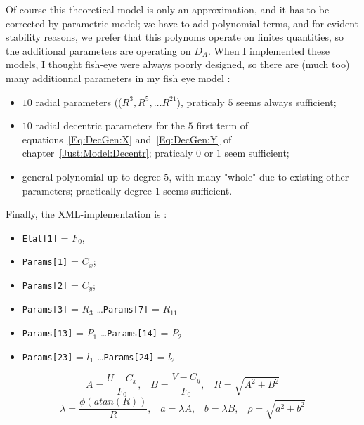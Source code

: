 Of course this theoretical model is only an approximation, and it has to be corrected
by parametric model; we have to add polynomial terms, and for evident stability reasons,
we prefer that this polynoms operate on finites quantities, so the additional
parameters are operating on $D_A$.  When I implemented these models, I thought
fish-eye were always poorly designed, so there are (much too) many additionnal
parameters in my fish eye model :


\begin{itemize}
   \item $10$  radial parameters (($R^3, R^5 , \dots R^{21}$), praticaly $5$ seems
          always sufficient;

   \item $10$ radial decentric parameters for the $5$ first term of equations~\ref{Eq:DecGen:X}
         and~\ref{Eq:DecGen:Y} of chapter~\ref{Just:Model:Decentr}; praticaly $0$ or $1$
         seem sufficient;

   \item general polynomial up to degree $5$, with many "whole" due to existing other parameters;
         practically degree $1$ seems sufficient.

\end{itemize}

Finally, the XML-implementation is :

\begin{itemize}
    \item   {\tt Etat[1]} = $F_0$,
    \item  {\tt Params[1]} = $C_x$;
    \item  {\tt Params[2]} = $C_y$;
    \item  {\tt Params[3]} =  $R_3$ \dots {\tt Params[7]} =  $R_{11}$
    \item  {\tt Params[13]} =  $P_1$ \dots {\tt Params[14]} =  $P_2$
    \item  {\tt Params[23]} =  $l_1$ \dots {\tt Params[24]} =  $l_2$
\end{itemize}

\begin{equation}
    A=\frac{U-C_x}{F_0}
    ,\;\;\;  B=\frac{V-C_y}{F_0}
    ,\;\;\; R=\sqrt{A^2 + B^2}
\end{equation}
\begin{equation}
    \lambda=  \frac{\phi(atan(R))}{R}
    ,\;\;\; a = \lambda A
    ,\;\;\; b = \lambda B
    ,\;\;\; \rho = \sqrt{a^2 + b^2}
\end{equation}


